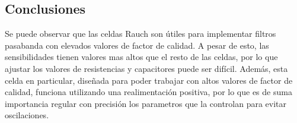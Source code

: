 \subsection{Conclusiones}
Se puede observar que las celdas Rauch son \'utiles para implementar filtros pasabanda con elevados valores de factor de calidad. A pesar de esto, las sensibilidades tienen valores mas altos que el resto de las celdas, por lo que ajustar los valores de resistencias y capacitores puede ser dif\'icil. Adem\'as, esta celda en particular, dise\~nada para poder trabajar con altos valores de factor de calidad, funciona utilizando una realimentaci\'on positiva, por lo que es de suma importancia regular con precisi\'on los parametros que la controlan para evitar oscilaciones.